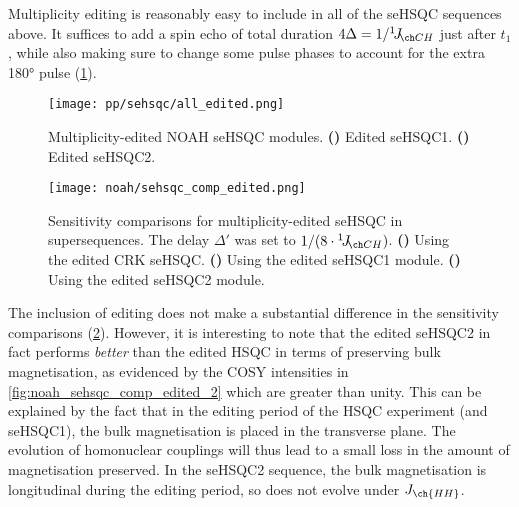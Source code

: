 Multiplicity editing is reasonably easy to include in all of the seHSQC sequences above.
It suffices to add a spin echo of total duration $4\Delta = 1 / \oneJ{CH}$ just after $t_1$, while also making sure to change some pulse phases to account for the extra \proton{} \ang{180} pulse (\cref{fig:sehsqc_edited}).

\begin{figure}[!ht]
    \centering
    \texttt{[image: pp/sehsqc/all\_edited.png]}%
    {\label{fig:sehsqc_edited_1}}%
    {\label{fig:sehsqc_edited_2}}%
    \caption[Multiplicity-edited NOAH seHSQC modules]{
        Multiplicity-edited NOAH seHSQC modules.
        \textbf{()} Edited seHSQC1.
        \textbf{()} Edited seHSQC2.
    }
    \label{fig:sehsqc_edited}
\end{figure}

\begin{figure}[!ht]
    \centering
    \texttt{[image: noah/sehsqc\_comp\_edited.png]}%
    {\label{fig:noah_sehsqc_comp_edited_crk}}%
    {\label{fig:noah_sehsqc_comp_edited_1}}%
    {\label{fig:noah_sehsqc_comp_edited_2}}%
    \caption[Sensitivity comparisons for multiplicity-edited seHSQC]{
        Sensitivity comparisons for multiplicity-edited seHSQC in  supersequences.
        The delay $\Delta'$ was set to $1 / (8 \cdot \oneJ{CH})$.
        \textbf{()} Using the edited CRK seHSQC.
        \textbf{()} Using the edited seHSQC1 module.
        \textbf{()} Using the edited seHSQC2 module.
    }
    \label{fig:noah_sehsqc_comp_edited}
\end{figure}

The inclusion of editing does not make a substantial difference in the sensitivity comparisons (\cref{fig:noah_sehsqc_comp_edited}).
However, it is interesting to note that the edited seHSQC2 in fact performs \textit{better} than the edited HSQC in terms of preserving bulk magnetisation, as evidenced by the COSY intensities in \cref{fig:noah_sehsqc_comp_edited_2} which are greater than unity.
This can be explained by the fact that in the editing period of the HSQC experiment (and seHSQC1), the bulk magnetisation is placed in the transverse plane.
The evolution of homonuclear couplings will thus lead to a small loss in the amount of  magnetisation preserved.
In the seHSQC2 sequence, the bulk magnetisation is longitudinal during the editing period, so does not evolve under $J_{\ch{HH}}$.



